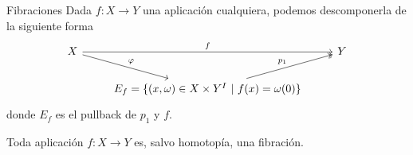 \begin{frame}[fragile]{Fibraciones}
Dada $f: X \longrightarrow Y$ una aplicación cualquiera, podemos descomponerla de la siguiente forma
\[
\begin{tikzcd}
X \arrow{rr}{f} \drar{\varphi} & & Y \\
 & E_f = \{ (x, \omega ) \in X \times Y^I \ \vert \ f(x) = \omega(0) \} \urar[twoheadrightarrow]{p_1} &
\end{tikzcd}
\]
donde $E_f$ es el pullback de $p_1$ y $f$.
\pause
\begin{teor}
Toda aplicación $f : X \longrightarrow Y$ es, salvo homotopía, una fibración. 
\end{teor}
\end{frame}

